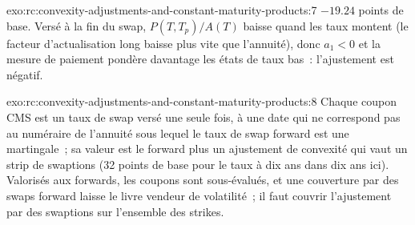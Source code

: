 \begin{solution}{exo:rc:convexity-adjustments-and-constant-maturity-products:7}
$-19.24$ points de base. Versé à la fin du swap, $P(T,T_p)/A(T)$ baisse quand les taux
montent (le facteur d'actualisation long baisse plus vite que l'annuité), donc $a_1<0$ et
la mesure de paiement pondère davantage les états de taux bas~: l'ajustement est négatif.
\end{solution}

\begin{solution}{exo:rc:convexity-adjustments-and-constant-maturity-products:8}
Chaque coupon CMS est un taux de swap versé une seule fois, à une date qui ne correspond pas au
numéraire de l'annuité sous lequel le taux de swap forward est une martingale~; sa valeur
est le forward plus un ajustement de convexité qui vaut un strip de swaptions (32
points de base pour le taux à dix ans dans dix ans ici). Valorisés aux forwards, les
coupons sont sous-évalués, et une couverture par des swaps forward laisse le livre vendeur
de volatilité~; il faut couvrir l'ajustement par des swaptions sur l'ensemble des strikes.
\end{solution}

